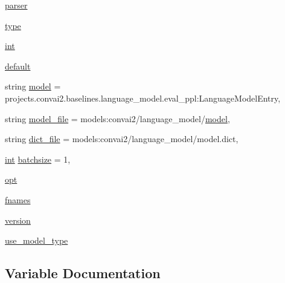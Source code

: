 \begin{DoxyCompactItemize}
\item 
\hyperlink{namespacelanguage__model_1_1eval__ppl_a45981ffc7b8bc90dfc7b6174d7461e8e}{parser}
\item 
\hyperlink{namespacelanguage__model_1_1eval__ppl_a750e75a8688a4996ea96948e7e5150ba}{type}
\item 
\hyperlink{namespacelanguage__model_1_1eval__ppl_a7d12ee00479673c5c8d1f6d01faa272a}{int}
\item 
\hyperlink{namespacelanguage__model_1_1eval__ppl_a4bd739c0bc1c2a44ca004da00b00929c}{default}
\item 
string \hyperlink{namespacelanguage__model_1_1eval__ppl_a143b76616f2544bf3bbac14ea7534075}{model} = \textquotesingle{}projects.\+convai2.\+baselines.\+language\+\_\+model.\+eval\+\_\+ppl\+:\+Language\+Model\+Entry\textquotesingle{},
\item 
string \hyperlink{namespacelanguage__model_1_1eval__ppl_aaaadb7317e9a70e9acbd33e297cd9709}{model\+\_\+file} = \textquotesingle{}models\+:convai2/language\+\_\+model/\hyperlink{namespacelanguage__model_1_1eval__ppl_a143b76616f2544bf3bbac14ea7534075}{model}\textquotesingle{},
\item 
string \hyperlink{namespacelanguage__model_1_1eval__ppl_afd91b44491c24283dd185fe6ad82af15}{dict\+\_\+file} = \textquotesingle{}models\+:convai2/language\+\_\+model/model.\+dict\textquotesingle{},
\item 
\hyperlink{namespacelanguage__model_1_1eval__ppl_a7d12ee00479673c5c8d1f6d01faa272a}{int} \hyperlink{namespacelanguage__model_1_1eval__ppl_aba887a9b7e5e27341cb724d34d4f6b5f}{batchsize} = 1,
\item 
\hyperlink{namespacelanguage__model_1_1eval__ppl_aba3c9374ac5406ca41a085d79c769163}{opt}
\item 
\hyperlink{namespacelanguage__model_1_1eval__ppl_a614e3f977cb9a72c937169c388d1cef6}{fnames}
\item 
\hyperlink{namespacelanguage__model_1_1eval__ppl_a8cb118eb13e859eb0a79b875ac7859cb}{version}
\item 
\hyperlink{namespacelanguage__model_1_1eval__ppl_a7a4b59869d10fb09cb2ff82597082841}{use\+\_\+model\+\_\+type}
\end{DoxyCompactItemize}


\subsection{Variable Documentation}
\mbox{\label{namespacelanguage__model_1_1eval__ppl_aba887a9b7e5e27341cb724d34d4f6b5f}} 
